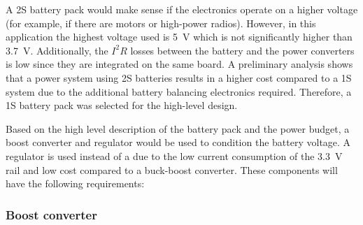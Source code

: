 \documentclass[]{report}
\begin{document}
A 2S battery pack would make sense if the electronics operate on a higher voltage (for example, if there are motors or high-power radios). However, in this application the highest voltage used is \SI{5}{\volt} which is not significantly higher than \SI{3.7}{\volt}. Additionally, the $I^2R$ losses between the battery and the power converters is low since they are integrated on the same board. A preliminary analysis shows that a power system using 2S batteries results in a higher cost compared to a 1S system due to the additional battery balancing electronics required. Therefore, a 1S battery pack was selected for the high-level design.

Based on the high level description of the battery pack and the power budget, a boost converter and regulator would be used to condition the battery voltage. A regulator is used instead of a due to the low current consumption of the \SI{3.3}{\volt} rail and low cost compared to a buck-boost converter. These components will have the following requirements:

\subsubsection{Boost converter}
\end{document}
